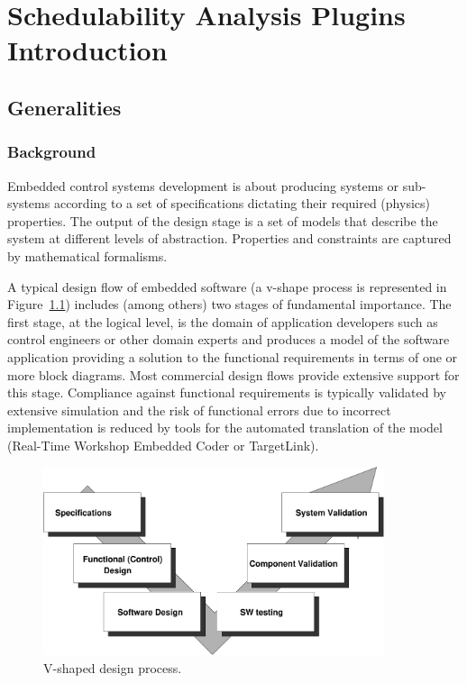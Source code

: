 \chapter{Schedulability Analysis Plugins Introduction}
\label{cha:schedulability-analysis-introduction}

\section{Generalities}


\subsection{Background}

Embedded control systems development is about producing systems or
sub-systems according to a set of specifications dictating their
required (physics) properties. The output of the design stage is a set
of models that describe the system at different levels of
abstraction. Properties and constraints are captured by mathematical
formalisms.

A typical design flow of embedded software (a v-shape process is
represented in Figure~\ref{fig:V-shaped-design-process.}) includes
(among others) two stages of fundamental importance. The first stage,
at the logical level, is the domain of application developers such as
control engineers or other domain experts and produces a model of the
software application providing a solution to the functional
requirements in terms of one or more block diagrams. Most commercial
design flows provide extensive support for this stage. Compliance
against functional requirements is typically validated by extensive
simulation and the risk of functional errors due to incorrect
implementation is reduced by tools for the automated translation of
the model (Real-Time Workshop Embedded Coder or TargetLink).

%
\begin{figure}
  \begin{center}
    \includegraphics[width=10cm]{images/vshape}
  \end{center}
  \caption{V-shaped design process.}
  \label{fig:V-shaped-design-process.}
\end{figure}



